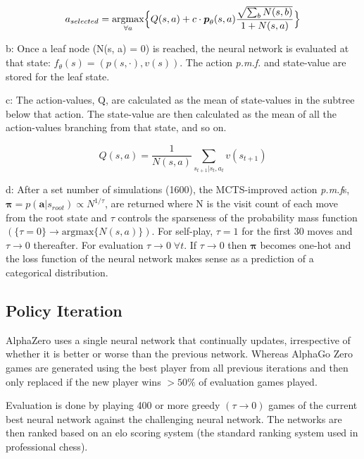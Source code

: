 \documentclass[../main.tex]{subfiles}
\begin{document}
\begin{equation}
   a_{selected} = \underset{\forall a}{\text{argmax}} \Big{\{}Q(s, a) + c \cdot\boldsymbol{p}_\theta (s, a)\frac{\sqrt{\sum_b N(s, b)}}{1 + N(s, a)}\Big{\}}
   \label{eqn:ucb}
\end{equation}

b:
Once a leaf node (N(s, a) = 0) is reached, the neural network is evaluated at that state: $f_\theta (s) = (p(s, \cdot), v(s))$. The action \textit{p.m.f.} and state-value are stored for the leaf state.

c:
The action-values, Q, are calculated as the mean of state-values in the subtree below that action. The state-value are then calculated as the mean of all the action-values branching from that state, and so on.

\begin{equation}
   Q(s, a) = \frac{1}{N(s, a)} \sum_{s_{t+1} | s_t, a_t} v(s_{t+1})
   \label{eqn:actionvalue}
\end{equation} 

d:
After a set number of simulations (1600), the MCTS-improved action \textit{p.m.f}s, $\boldsymbol{\pi} = p(\boldsymbol{a} | s_{root}) \propto N^{1/\tau}$, are returned where N is the visit count of each move from the root state and $\tau$ controls the sparseness of the probability mass function $(\{\tau = 0\} \rightarrow \text{argmax}\{N(s, a)\})$. For self-play, $\tau = 1$ for the first 30 moves and $\tau \rightarrow 0$ thereafter. For evaluation $\tau \rightarrow 0 \; \forall t$. If $\tau \rightarrow 0$ then $\boldsymbol{\pi}$ becomes one-hot and the loss function of the neural network makes sense as a prediction of a categorical distribution.

\subsection{Policy Iteration}

AlphaZero uses a single neural network that continually updates, irrespective of whether it is better or worse than the previous network. Whereas AlphaGo Zero games are generated using the best player from all previous iterations and then only replaced if the new player wins $> 50\%$ of evaluation games played.

Evaluation is done by playing 400 or more greedy $(\tau \rightarrow 0)$ games of the current best neural network against the challenging neural network. The networks are then ranked based on an elo scoring system (the standard ranking system used in professional chess).

\onlyinsubfile{}
\end{document}
